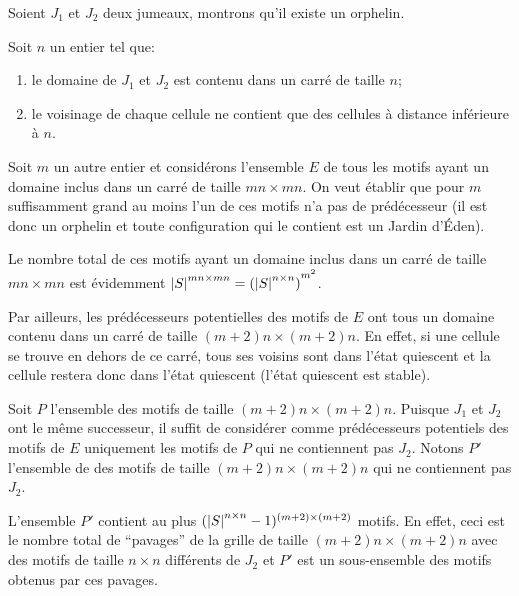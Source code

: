 \begin{proofI}
\begin{itemize}
		      Soient $J_1$ et $J_2$ deux jumeaux, montrons qu'il existe un orphelin.

		      Soit $n$ un entier tel que:
		      \begin{enumerate}
			      \item le domaine de $J_1$ et $J_2$ est contenu dans un carré de taille $n$;
			      \item le voisinage de chaque cellule ne contient que des cellules à distance inférieure à $n$.
		      \end{enumerate}
		      Soit $m$ un autre entier et considérons l'ensemble $E$ de tous les motifs ayant un domaine inclus
		      dans un carré de taille $mn \times mn$.
		      On veut établir que pour $m$ suffisamment grand au moins l'un de ces motifs n'a pas
		      de prédécesseur (il est donc un orphelin et toute
		      configuration qui le contient est un Jardin d'\'Eden).

		      Le nombre total de ces motifs ayant un domaine inclus
		      dans un carré de taille $mn \times mn$ est évidemment $\left|S\right|  ^{mn \times mn}= {(\left|S\right|  ^{n \times n})}^{m^2}$.

		      Par ailleurs, les prédécesseurs potentielles des motifs de $E$ ont tous un domaine contenu dans
		      un carré de taille $(m+2)n \times (m+2)n$.
		      En effet, si une cellule se trouve en dehors de ce carré, tous ses voisins sont dans l'état quiescent et la cellule
		      restera donc dans l'état quiescent (l'état quiescent est stable).


		      Soit $P$ l'ensemble des motifs de taille $(m+2)n \times (m+2)n$. Puisque  $J_1$ et $J_2$  ont
		      le même successeur, il suffit de considérer comme prédécesseurs potentiels
		      des motifs de $E$ uniquement les motifs de $P$ qui ne contiennent pas $J_2$.
		      Notons $P'$ l'ensemble de  des motifs de taille $(m+2)n \times (m+2)n$ qui ne contiennent pas $J_2$.

		      L'ensemble $P'$ contient au plus $(\left|S\right| ^{n \times n}-1)^{(m + 2) \times (m + 2)}$ motifs.
		      En effet, ceci est le nombre total de ``pavages'' de la grille de taille $(m+2)n \times (m+2)n$ avec des motifs
		      de taille $n \times n$ différents de $J_2$ et $P'$ est un sous-ensemble des motifs obtenus par ces pavages.


\end{itemize}
\end{proofI}
